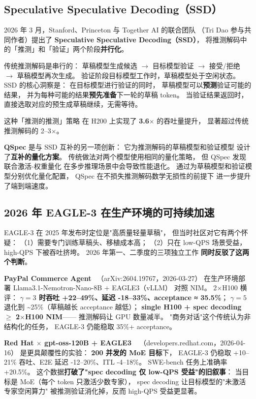 \subsection{Speculative Speculative Decoding（SSD）}

2026 年 3 月，Stanford、Princeton 与 Together AI 的联合团队
（Tri Dao 参与共同作者）提出了
\textbf{Speculative Speculative Decoding（SSD）}，
将推测解码中的「推测」和「验证」两个阶段\textbf{并行化}。

传统推测解码是串行的：
草稿模型生成候选 $\to$ 目标模型验证 $\to$
接受/拒绝 $\to$ 草稿模型再次生成。
验证阶段目标模型工作时，草稿模型处于空闲状态。
SSD 的核心洞察是：
在目标模型进行验证的同时，
草稿模型可以\textbf{预测}验证可能的结果，
并为每种可能的结果\textbf{预先准备}下一轮的草稿 token。
当验证结果返回时，
直接选取对应的预生成草稿继续，无需等待。

这种「推测的推测」策略
在 H200 上实现了 \textbf{3.6$\times$} 的吞吐量提升，
显著超过传统推测解码的 2--3$\times$。

\textbf{QSpec} 是与 SSD 互补的另一项创新：
它为推测解码的草稿模型和验证模型
设计了\textbf{互补的量化方案}。
传统做法对两个模型使用相同的量化策略，
但 QSpec 发现联合激活-权重量化
在多步推理场景中会导致性能退化。
通过为草稿模型和验证模型分别优化量化配置，
QSpec 在不损失推测解码数学无损性的前提下
进一步提升了端到端速度。

\subsection{2026 年 EAGLE-3 在生产环境的可持续加速}
\label{sec:eagle3-production}

EAGLE-3 在 2025 年发布时定位是"高质量轻量草稿"，
但当时社区对它有两个怀疑：
（1）需要专门训练草稿头、移植成本高；
（2）只在 low-QPS 场景受益，high-QPS 下被吞吐挤垮。
2026 年第一、二季度的三项独立工作
\textbf{同时反驳了这两个判断}。

\textbf{PayPal Commerce Agent}~\cite{paypalspec2026}
（arXiv:2604.19767，2026-03-27）
在生产环境部署 Llama3.1-Nemotron-Nano-8B + EAGLE3（vLLM）
对照 NIM。
2$\times$H100 横评：
\textbf{$\gamma=3$ 时吞吐 +22--49\%、延迟 -18--33\%、acceptance ≈ 35.5\%}；
$\gamma=5$ 退化到 \textasciitilde{}25\%（草稿越长 acceptance 越低）；
\textbf{single H100 + spec decoding $\geq$ 2$\times$H100 NIM}——
推测解码让 GPU 数量减半。
"商务对话"这个传统认为非结构化的任务，
EAGLE-3 仍能稳取 35\%+ acceptance。

\textbf{Red Hat $\times$ gpt-oss-120B + EAGLE3}
~\cite{redhatgptoss120spec2026}
（developers.redhat.com，2026-04-16）
是更具颠覆性的实验：
\textbf{200 并发的 MoE 目标}下，
EAGLE-3 仍稳取 +10--21\% 吞吐、E2E 延迟 -12--20\%、ITL -4--18\%。
SWE-bench 任务上准确率 +20.5\%。
这个数据\textbf{打破了"spec decoding 仅 low-QPS 受益"的旧叙事}：
当目标是 MoE（每个 token 只激活少数专家），
spec decoding 让目标模型的"未激活专家空闲算力"
被推测验证消化掉，反而 high-QPS 受益更显著。

